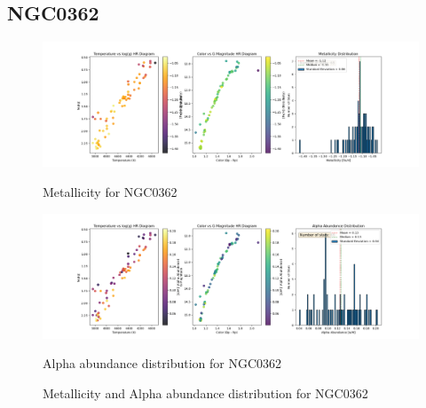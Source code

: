\documentclass[a4paper,12pt]{article}
\begin{document}
\subsection{NGC0362}
\begin{figure}[H]
    \centering
    \begin{minipage}[b]{0.8\textwidth}
        \centering
        \includegraphics[width=\textwidth]{NGC0362_metalicity.png}
        \caption{Metallicity for NGC0362}
        \label{fig:NGC0362_metalicity}
    \end{minipage}
    \hfill
    \begin{minipage}[b]{0.8\textwidth}
        \centering
        \includegraphics[width=\textwidth]{NGC0362_alpha.png}
        \caption{Alpha abundance distribution for NGC0362}
        \label{fig:NGC0362_alpha}
    \end{minipage}
    \caption{Metallicity and Alpha abundance distribution for NGC0362}
    \label{fig:NGC0362_combined}
\end{figure}
\clearpage
\end{document}
